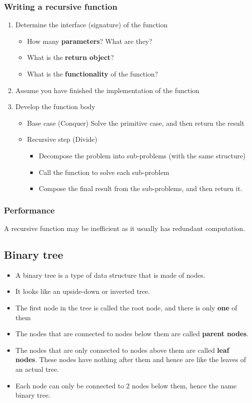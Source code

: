 \documentclass[11pt]{article}
\begin{document}
\subsubsection{Writing a recursive function}
\label{sec:org3c6493f}
\begin{enumerate}
\item Determine the interface (signature) of the function
\begin{itemize}
\item How many \textbf{parameters}? What are they?
\item What is the \textbf{return object}?
\item What is the \textbf{functionality} of the function?
\end{itemize}

\item Assume you have finished the implementation of the function
\item Develop the function body
\begin{itemize}
\item Base case (Conquer)
Solve the primitive case, and then return the result
\item Recursive step (Divide)
\begin{itemize}
\item Decompose the problem into sub-problems (with the same structure)
\item Call the function to solve each sub-problem
\item Compose the final result from the sub-problems, and then return it.
\end{itemize}
\end{itemize}
\end{enumerate}

\subsubsection{Performance}
\label{sec:org776e716}
A recursive function may be inefficient as it usually has redundant computation.

\subsection{Binary tree}
\label{sec:org9657674}
\begin{itemize}
\item A binary tree is a type of data structure that is made of nodes.
\item It looks like an upside-down or inverted tree.
\item The first node in the tree is called the root node, and there is only \textbf{one} of them
\item The nodes that are connected to nodes below them are called \textbf{parent nodes}.
\item The nodes that are only connected to nodes above them are called \textbf{leaf nodes}. These nodes have nothing after them and hence are like the leaves of an actual tree.
\item Each node can only be connected to 2 nodes below them, hence the name binary tree.
\end{itemize}
\end{document}
